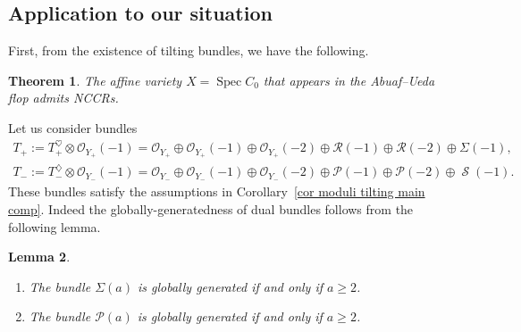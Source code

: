 \documentclass[10pt,a4paper]{amsart}
\DeclareMathOperator{\Spi}{\mathcal{S}}
\DeclareMathOperator{\Spec}{Spec}
\newcommand{\stsh}{\mathcal{O}}
\numberwithin{equation}{section}
\newtheorem{Theorem}{Theorem}[section]
\newtheorem{Lemma}[Theorem]{Lemma}
\begin{document}
\subsection{Application to our situation}

First, from the existence of tilting bundles, we have the following.

\begin{Theorem}
The affine variety $X = \Spec C_0$ that appears in the Abuaf--Ueda flop admits NCCRs.
\end{Theorem}

Let us consider bundles
\begin{gather*}
T_+ := T_+^{\heartsuit} \otimes \stsh_{Y_+}(-1) = \stsh_{Y_+} \oplus \stsh_{Y_+}(-1) \oplus \stsh_{Y_+}(-2) \oplus \mathcal{R}(-1) \oplus \mathcal{R}(-2) \oplus \Sigma(-1), \\
T_- := T_-^{\diamondsuit} \otimes \stsh_{Y_-}(-1) = \stsh_{Y_-} \oplus \stsh_{Y_-}(-1) \oplus \stsh_{Y_-}(-2) \oplus \mathcal{P}(-1) \oplus \mathcal{P}(-2) \oplus \Spi(-1).
\end{gather*}
These bundles satisfy the assumptions in Corollary~\ref{cor moduli tilting main comp}.
Indeed the globally-generatedness of dual bundles follows from the following lemma.

\begin{Lemma}\quad
\begin{enumerate}\itemsep=0pt
\item[$1.$] The bundle $\Sigma(a)$ is globally generated if and only if $a \geq 2$.
\item[$2.$] The bundle $\mathcal{P}(a)$ is globally generated if and only if $a \geq 2$.
\end{enumerate}
\end{Lemma}
\end{document}
